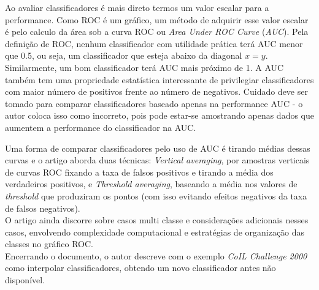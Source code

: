 \documentclass[12pt]{article}
\begin{document}
\begin{enumerate}
\begin{addmargin}[1em]{2em}
	Ao avaliar classificadores é mais direto termos um valor escalar para a performance. Como ROC é um gráfico, um método de adquirir esse valor escalar é pelo calculo da área sob a curva ROC ou \textit{Area Under ROC Curve} (\textit{AUC}). Pela definição de ROC, nenhum classificador com utilidade prática terá AUC menor que 0.5, ou seja, um classificador que esteja abaixo da diagonal $x=y$. Similarmente, um bom classificador terá AUC mais próximo de 1. A AUC também tem uma propriedade estatística interessante de privilegiar classificadores com maior número de positivos frente ao número de negativos. Cuidado deve ser tomado para comparar classificadores baseado apenas na performance AUC - o autor coloca isso como incorreto, pois pode estar-se amostrando apenas dados que aumentem a performance do classificador na AUC.
	
\pagebreak

	Uma forma de comparar classificadores pelo uso de AUC é tirando médias dessas curvas e o artigo aborda duas técnicas: \textit{Vertical averaging}, por amostras verticais de curvas ROC fixando a taxa de falsos positivos e tirando a média dos verdadeiros positivos, e \textit{Threshold averaging}, baseando a média nos valores de \textit{threshold} que produziram os pontos (com isso evitando efeitos negativos da taxa de falsos negativos).\\
	O artigo ainda discorre sobre casos multi classe e considerações adicionais nesses casos, envolvendo complexidade computacional e estratégias de organização das classes no gráfico ROC.\\
	Encerrando o documento, o autor descreve com o exemplo \textit{CoIL Challenge 2000} como interpolar classificadores, obtendo um novo classificador antes não disponível.
	\end{addmargin}	


\end{enumerate}
\end{document}
